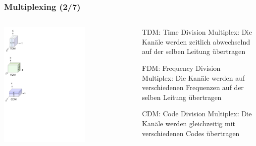 \documentclass[ignorenonframetext]{beamer}
\begin{document}
\begin{frame}
\frametitle{Multiplexing (2/7)}
\begin{columns}
\begin{column}{3cm}
\begin{center}
\includegraphics[width=0.7\textwidth]{multiplex}
\end{center}
\end{column}
\begin{column}{8cm}
\begin{itemize}
\item[TDM:] Time Division Multiplex: Die Kan\"ale werden zeitlich abwechselnd auf
	der selben Leitung \"ubertragen
\item[FDM:] Frequency Division Multiplex: Die Kan\"ale werden auf verschiedenen Frequenzen
	auf der selben Leitung \"ubertragen
\item[CDM:] Code Division Multiplex: Die Kan\"ale werden gleichzeitig mit verschiedenen
	Codes \"ubertragen
\end{itemize}
\end{column}
\end{columns}
\end{frame}
\end{document}
